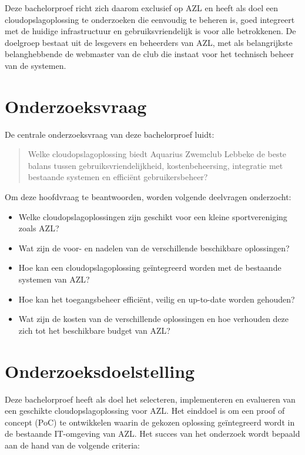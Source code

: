 Deze bachelorproef richt zich daarom exclusief op AZL en heeft als doel een cloudopslagoplossing te onderzoeken die eenvoudig te beheren is, goed integreert met de huidige infrastructuur en gebruiksvriendelijk is voor alle betrokkenen. De doelgroep bestaat uit de lesgevers en beheerders van AZL, met als belangrijkste belanghebbende de webmaster van de club die instaat voor het technisch beheer van de systemen.

\section{Onderzoeksvraag}%
\label{sec:onderzoeksvraag}

De centrale onderzoeksvraag van deze bachelorproef luidt:

\begin{quote}
Welke cloudopslagoplossing biedt Aquarius Zwemclub Lebbeke de beste balans tussen gebruiksvriendelijkheid, kostenbeheersing, integratie met bestaande systemen en efficiënt gebruikersbeheer?
\end{quote}

Om deze hoofdvraag te beantwoorden, worden volgende deelvragen onderzocht:

\begin{itemize}
  \item Welke cloudopslagoplossingen zijn geschikt voor een kleine sportvereniging zoals AZL?
  \item Wat zijn de voor- en nadelen van de verschillende beschikbare oplossingen?
  \item Hoe kan een cloudopslagoplossing geïntegreerd worden met de bestaande systemen van AZL?
  \item Hoe kan het toegangsbeheer efficiënt, veilig en up-to-date worden gehouden?
  \item Wat zijn de kosten van de verschillende oplossingen en hoe verhouden deze zich tot het beschikbare budget van AZL?
\end{itemize}

\section{Onderzoeksdoelstelling}%
\label{sec:onderzoeksdoelstelling}

Deze bachelorproef heeft als doel het selecteren, implementeren en evalueren van een geschikte cloudopslagoplossing voor AZL. Het einddoel is om een proof of concept (PoC) te ontwikkelen waarin de gekozen oplossing geïntegreerd wordt in de bestaande IT-omgeving van AZL. Het succes van het onderzoek wordt bepaald aan de hand van de volgende criteria:

